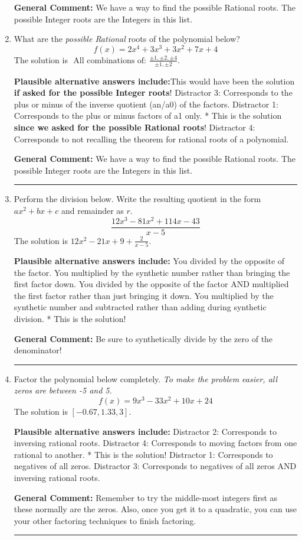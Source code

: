 \documentclass{extbook}[14pt]
\newcommand{\litem}[1]{\item #1

\rule{\textwidth}{0.4pt}}
\begin{document}
\begin{enumerate}
{\textbf{General Comment:} We have a way to find the possible Rational roots. The possible Integer roots are the Integers in this list.
}
\litem{
What are the \textit{possible Rational} roots of the polynomial below?
\[ f(x) = 2x^{4} +3 x^{3} +3 x^{2} +7 x + 4 \]The solution is \( \text{ All combinations of: }\frac{\pm 1,\pm 2,\pm 4}{\pm 1,\pm 2} \).\begin{enumerate}[label=\Alph*.]
\textbf{Plausible alternative answers include:}This would have been the solution \textbf{if asked for the possible Integer roots}!
 Distractor 3: Corresponds to the plus or minus of the inverse quotient (an/a0) of the factors. 
 Distractor 1: Corresponds to the plus or minus factors of a1 only.
* This is the solution \textbf{since we asked for the possible Rational roots}!
 Distractor 4: Corresponds to not recalling the theorem for rational roots of a polynomial.
\end{enumerate}

\textbf{General Comment:} We have a way to find the possible Rational roots. The possible Integer roots are the Integers in this list.
}
\litem{
Perform the division below. Write the resulting quotient in the form $ax^2+bx+c$ and remainder as $r$.
\[ \frac{12x^{3} -81 x^{2} +114 x -43}{x -5} \]The solution is \( 12x^{2} -21 x + 9 + \frac{2}{x -5} \).\begin{enumerate}[label=\Alph*.]
\textbf{Plausible alternative answers include:} You divided by the opposite of the factor.
 You multiplied by the synthetic number rather than bringing the first factor down.
 You divided by the opposite of the factor AND multiplied the first factor rather than just bringing it down.
 You multiplied by the synthetic number and subtracted rather than adding during synthetic division.
* This is the solution!
\end{enumerate}

\textbf{General Comment:} Be sure to synthetically divide by the zero of the denominator!
}
\litem{
Factor the polynomial below completely. \textit{To make the problem easier, all zeros are between -5 and 5.}
\[ f(x) = 9x^{3} -33 x^{2} +10 x + 24 \]The solution is \( [-0.67, 1.33, 3] \).\begin{enumerate}[label=\Alph*.]
\textbf{Plausible alternative answers include:} Distractor 2: Corresponds to inversing rational roots.
 Distractor 4: Corresponds to moving factors from one rational to another.
* This is the solution!
 Distractor 1: Corresponds to negatives of all zeros.
 Distractor 3: Corresponds to negatives of all zeros AND inversing rational roots.
\end{enumerate}

\textbf{General Comment:} Remember to try the middle-most integers first as these normally are the zeros. Also, once you get it to a quadratic, you can use your other factoring techniques to finish factoring.
}
\end{enumerate}
\end{document}

